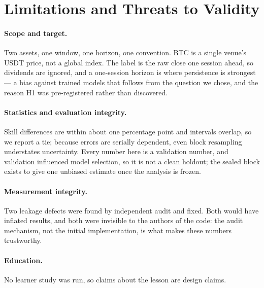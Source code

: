 \section{Limitations and Threats to Validity}
\label{sec:limitations}

\paragraph{Scope and target.}
Two assets, one window, one horizon, one convention. BTC is a single venue's USDT
price, not a global index. The label is the raw close one session ahead, so
dividends are ignored, and a one-session horizon is where persistence is
strongest --- a bias against trained models that follows from the question we
chose, and the reason H1 was pre-registered rather than discovered.

\paragraph{Statistics and evaluation integrity.}
Skill differences are within about one percentage point and intervals overlap, so
we report a tie; because errors are serially dependent, even block resampling
understates uncertainty. Every number here is a validation number, and validation
influenced model selection, so it is not a clean holdout; the sealed block exists
to give one unbiased estimate once the analysis is frozen.

\paragraph{Measurement integrity.}
Two leakage defects were found by independent audit and fixed. Both would have inflated results, and both were invisible to the authors of the
code: the audit mechanism, not the initial implementation, is what makes these
numbers trustworthy.

\paragraph{Education.}
No learner study was run, so claims about the lesson are design claims.
